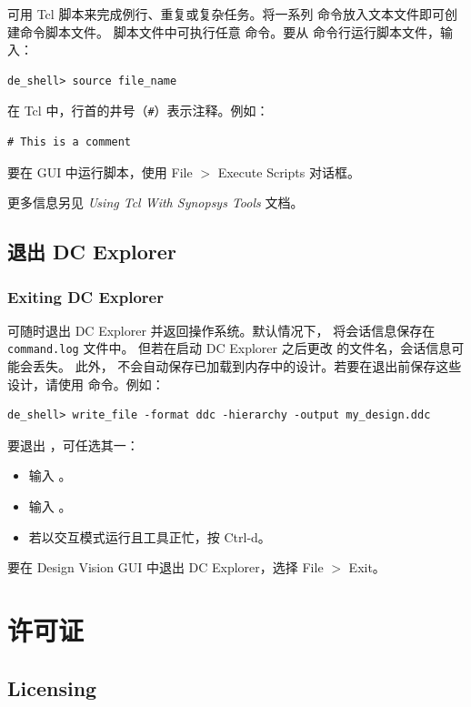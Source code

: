 可用 Tcl 脚本来完成例行、重复或复杂任务。将一系列  命令放入文本文件即可创建命令脚本文件。
脚本文件中可执行任意  命令。要从  命令行运行脚本文件，输入：
\begin{lstlisting}
de_shell> source file_name
\end{lstlisting}

在 Tcl 中，行首的井号（\texttt{\#}）表示注释。例如：
\begin{lstlisting}
# This is a comment
\end{lstlisting}

要在 GUI 中运行脚本，使用 File $>$ Execute Scripts 对话框。

更多信息另见 \textit{Using Tcl With Synopsys Tools} 文档。

\subsection{退出 DC Explorer}
\subsubsection*{Exiting DC Explorer}

可随时退出 DC Explorer 并返回操作系统。默认情况下， 将会话信息保存在 \texttt{command.log} 文件中。
但若在启动 DC Explorer 之后更改  的文件名，会话信息可能会丢失。
此外， 不会自动保存已加载到内存中的设计。若要在退出前保存这些设计，请使用  命令。例如：
\begin{lstlisting}
de_shell> write_file -format ddc -hierarchy -output my_design.ddc
\end{lstlisting}

要退出 ，可任选其一：
\begin{itemize}
  \item 输入 。
  \item 输入 。
  \item 若以交互模式运行且工具正忙，按 Ctrl-d。
\end{itemize}

要在 Design Vision GUI 中退出 DC Explorer，选择 File $>$ Exit。

\section{许可证}
\subsection*{Licensing}


